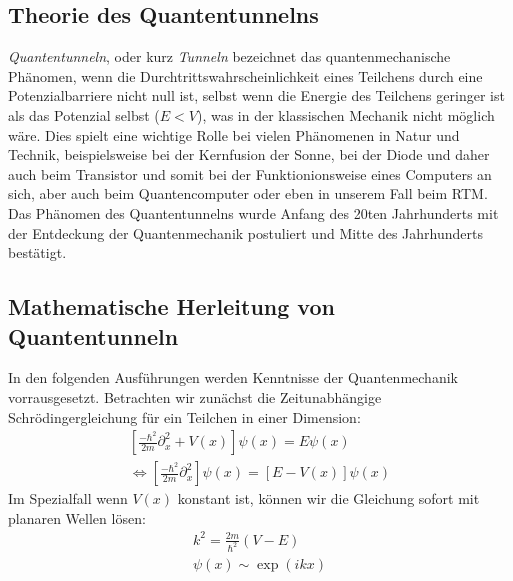 \subsection{Theorie des Quantentunnelns}
\textit{Quantentunneln}, oder kurz \textit{Tunneln} 
bezeichnet das quantenmechanische Phänomen, wenn 
die Durchtrittswahrscheinlichkeit eines Teilchens
durch eine Potenzialbarriere nicht null ist, selbst wenn die Energie
des Teilchens geringer ist als das Potenzial selbst ($E < V$), was
in der klassischen Mechanik nicht möglich wäre. Dies
spielt eine wichtige Rolle bei
vielen Phänomenen in Natur und Technik,
beispielsweise bei der Kernfusion der Sonne, bei der Diode und
daher auch beim Transistor und somit bei der Funktionionsweise
eines Computers an sich, aber auch beim Quantencomputer oder
eben in unserem Fall beim RTM. Das Phänomen des Quantentunnelns
wurde Anfang des 20ten Jahrhunderts mit der Entdeckung der 
Quantenmechanik postuliert und Mitte des Jahrhunderts bestätigt.
\subsection{Mathematische Herleitung von Quantentunneln}
In den folgenden Ausführungen werden Kenntnisse der Quantenmechanik
vorrausgesetzt. Betrachten wir zunächst die Zeitunabhängige
Schrödingergleichung für ein Teilchen in einer Dimension:
\begin{align}
\left [ \frac{-\hbar^2}{2m}\partial_x^2 + V(x) \right ]\psi(x) = E\psi(x) \\ 
\Leftrightarrow \left [ \frac{-\hbar^2}{2m}\partial_x^2 \right ]\psi(x) = \left [E-V(x) \right ]\psi(x) 
\end{align}
Im Spezialfall wenn $V(x)$ konstant ist, können wir die Gleichung
sofort mit planaren Wellen lösen:
\begin{align}
    k^2 = \frac{2m}{\hbar^2}(V-E)\\
    \psi(x) \sim \exp(ikx) 
\end{align}
